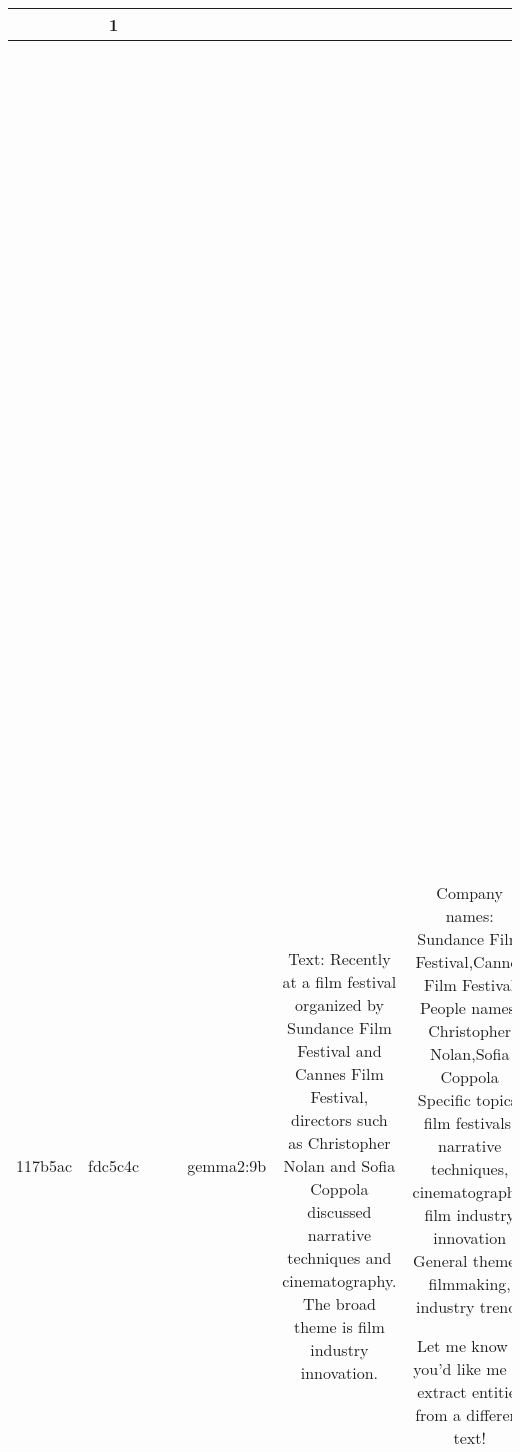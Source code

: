 \begin{table}[h!]
\begin{tabular}{|c|c|c|c|c|c|c|c|c|c|}
{Every element is correctly organized and labeled according to the instructions. As none of the rules require knowing the original input text for basic compliance checking, and format compliance is achieved, the output is deemed compliant.

OK & 1\\
\hline
117b5ac & fdc5c4c &  &  & gemma2:9b & Text: Recently at a film festival organized by Sundance Film Festival and Cannes Film Festival, directors such as Christopher Nolan and Sofia Coppola discussed narrative techniques and cinematography. The broad theme is film industry innovation. & Company names: Sundance Film Festival,Cannes Film Festival 
People names: Christopher Nolan,Sofia Coppola
Specific topics: film festivals, narrative techniques, cinematography, film industry innovation
General themes:  filmmaking, industry trends 


Let me know if you'd like me to extract entities from a different text! & ok & The output is checked against the criteria provided in the chatbot description:

1. **Company names**: The output lists "Sundance Film Festival" and "Cannes Film Festival" under company names. While it's not clear whether these are actually companies or events without the input text, we cannot verify this aspect of correctness based on the output alone. However, the format is compliant as per the description, which just requires a comma-separated list.

2. **People names**: "Christopher Nolan" and "Sofia Coppola" are provided as people names, which is in the format specified (comma-separated list).

3. **Specific topics**: The output lists multiple topics ("film festivals, narrative techniques, cinematography, film industry innovation") in a comma-separated format, which complies with the specified structure.

4. **General themes**: "filmmaking, industry trends" are given as themes, formatted correctly in a comma-separated list as per the guidelines.

Thus, the elements are formatted as requested, and no extra information outside of the specified structure is present. Everything is within the designated labels and follows the desired format.

OK & 1\\
\hline
117b5ac & fdc5c4c &  &  & qwen2.5:3b & Text: Recently at a film festival organized by Sundance Film Festival and Cannes Film Festival, directors such as Christopher Nolan and Sofia Coppola discussed narrative techniques and cinematography. The broad theme is film industry innovation. & ```json
{
  "Company names": "Sundance Film Festival, Cannes Film Festival",
  "People names": "-||-",
  "Specific topics": "narrative techniques, cinematography, film industry innovation",
  "General themes": "film festival events, directors' discussions"
}
```

}
\end{tabular}
\end{table}
